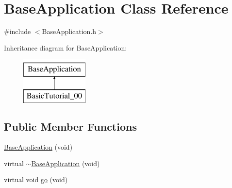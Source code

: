 \hypertarget{class_base_application}{\section{Base\-Application Class Reference}
\label{class_base_application}
}


{\ttfamily \#include $<$Base\-Application.\-h$>$}

Inheritance diagram for Base\-Application\-:\begin{figure}[H]
\begin{center}
\leavevmode
\includegraphics[height=2.382979cm]{class_base_application}
\end{center}
\end{figure}
\subsection*{Public Member Functions}
\begin{DoxyCompactItemize}
\item 
\hyperlink{class_base_application_a7c897f08816cc064568ae1ec71026719}{Base\-Application} (void)
\item 
virtual \hyperlink{class_base_application_a48e1966307d5ef8f6cbf8b6e980ad652}{$\sim$\-Base\-Application} (void)
\item 
virtual void \hyperlink{class_base_application_a8a14a65a29118dd75173aa68678a05e1}{go} (void)
\end{DoxyCompactItemize}
